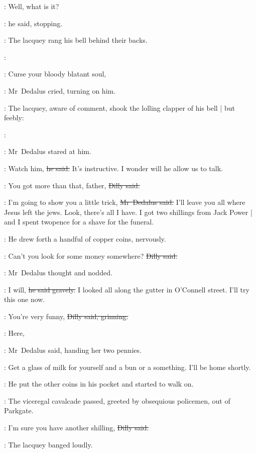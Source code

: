 \simon:
Well, what is it?

:
he said, stopping.

:
The lacquey rang his bell behind their backs.

\bell:

\simon:
Curse your bloody blatant soul,%

:
Mr~Dedalus cried,
turning on him.

:
The lacquey,
aware of comment,
shook the lolling clapper of his bell |
but feebly:

\bell:

:
Mr~Dedalus stared at him.

\simon:
Watch him,
\sout{he said.}
It's instructive.
I wonder will he allow us to talk.

\dilly:
You got more than that, father,
\sout{Dilly said.}

\simon:
I'm going to show you a little trick,
\sout{Mr~Dedalus said.}
I'll leave you all where Jesus left the jews.
Look, there's all I have.
I got two shillings from Jack Power |
and I spent twopence for a shave for the funeral.

:
He drew forth a handful of copper coins,%
nervously.

\dilly:
Can't you look for some money somewhere?
\sout{Dilly said.}

:
Mr~Dedalus thought and nodded.

\simon:
I will,
\sout{he said gravely.}
I looked all along the gutter in O'Connell street.
I'll try this one now.

\dilly:
You're very funny,
\sout{Dilly said, grinning.}

\simon:
Here,

:
Mr~Dedalus said,
handing her two pennies.

\simon:
Get a glass of milk for yourself
and a bun or a something.
I'll be home shortly.

:
He put the other coins in his pocket and started to walk on.

\begin{interject}
    :
    The viceregal cavalcade passed,
    greeted by obsequious policemen,
    out of Parkgate.
\end{interject}%

\dilly:
I'm sure you have another shilling,
\sout{Dilly said.}

:
The lacquey banged loudly.

